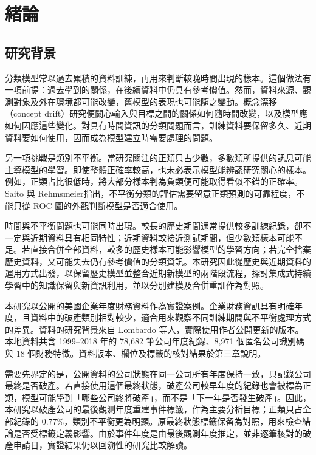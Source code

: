 \chapter{緒論}\label{chap:introduction}
\begingroup
\setlength{\emergencystretch}{2em}

\section{研究背景}

分類模型常以過去累積的資料訓練，再用來判斷較晚時間出現的樣本。這個做法有一項前提：過去學到的關係，在後續資料中仍具有參考價值。然而，資料來源、觀測對象及外在環境都可能改變，舊模型的表現也可能隨之變動。概念漂移（concept drift）研究便關心輸入與目標之間的關係如何隨時間改變，以及模型應如何因應這些變化\autocite{gama2014drift}。對具有時間資訊的分類問題而言，訓練資料要保留多久、近期資料要如何使用，因而成為模型建立時需要處理的問題。

另一項挑戰是類別不平衡。當研究關注的正類只占少數，多數類所提供的訊息可能主導模型的學習。即使整體正確率較高，也未必表示模型能辨認研究關心的樣本。例如，正類占比很低時，將大部分樣本判為負類便可能取得看似不錯的正確率。Saito 與 Rehmsmeier\autocite{saito2015pr}指出，不平衡分類的評估需要留意正類預測的可靠程度，不能只從 ROC 圖的外觀判斷模型是否適合使用。

時間與不平衡問題也可能同時出現。較長的歷史期間通常提供較多訓練紀錄，卻不一定與近期資料具有相同特性；近期資料較接近測試期間，但少數類樣本可能不足。若直接合併全部資料，較多的歷史樣本可能影響模型的學習方向；若完全捨棄歷史資料，又可能失去仍有參考價值的分類資訊。本研究因此從歷史與近期資料的運用方式出發，以保留歷史模型並整合近期新模型的兩階段流程，探討集成式持續學習中的知識保留與新資訊利用，並以分別建模及合併重訓作為對照。

本研究以公開的美國企業年度財務資料作為實證案例。企業財務資訊具有明確年度，且資料中的破產類別相對較少，適合用來觀察不同訓練期間與不平衡處理方式的差異。資料的研究背景來自 Lombardo 等人\autocite{lombardo2022bankruptcy}，實際使用作者公開更新的版本\autocite{sowide-bankruptcy-data}。本地資料共含 1999--2018 年的 78,682 筆公司年度紀錄、8,971 個匿名公司識別碼與 18 個財務特徵。資料版本、欄位及標籤的核對結果於第三章說明。

需要先界定的是，公開資料的公司狀態在同一公司所有年度保持一致，只記錄公司最終是否破產。若直接使用這個最終狀態，破產公司較早年度的紀錄也會被標為正類，模型可能學到「哪些公司終將破產」，而不是「下一年是否發生破產」。因此，本研究以破產公司的最後觀測年度重建事件標籤，作為主要分析目標；正類只占全部紀錄的 0.77\%，類別不平衡更為明顯。原最終狀態標籤保留為對照，用來檢查結論是否受標籤定義影響。由於事件年度是由最後觀測年度推定，並非逐筆核對的破產申請日，實證結果仍以回溯性的研究比較解讀。

